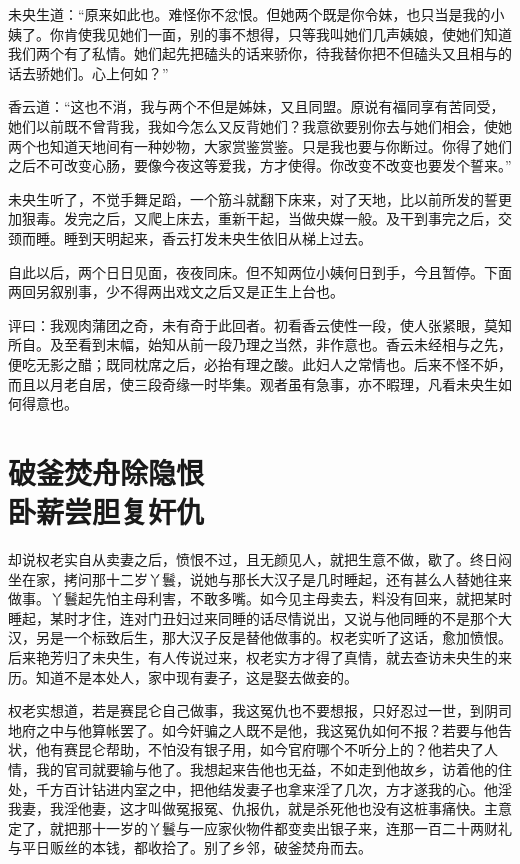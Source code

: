 \documentclass[a4paper,12pt,UTF8,twoside]{ctexbook}
\begin{document}
未央生道：“原来如此也。难怪你不忿恨。但她两个既是你令妹，也只当是我的小姨了。你肯使我见她们一面，别的事不想得，只等我叫她们几声姨娘，使她们知道我们两个有了私情。她们起先把磕头的话来骄你，待我替你把不但磕头又且相与的话去骄她们。心上何如？”

香云道：“这也不消，我与两个不但是姊妹，又且同盟。原说有福同享有苦同受，她们以前既不曾背我，我如今怎么又反背她们？我意欲要别你去与她们相会，使她两个也知道天地间有一种妙物，大家赏鉴赏鉴。只是我也要与你断过。你得了她们之后不可改变心肠，要像今夜这等爱我，方才使得。你改变不改变也要发个誓来。”

未央生听了，不觉手舞足蹈，一个筋斗就翻下床来，对了天地，比以前所发的誓更加狠毒。发完之后，又爬上床去，重新干起，当做央媒一般。及干到事完之后，交颈而睡。睡到天明起来，香云打发未央生依旧从梯上过去。

自此以后，两个日日见面，夜夜同床。但不知两位小姨何日到手，今且暂停。下面两回另叙别事，少不得两出戏文之后又是正生上台也。

评曰：我观肉蒲团之奇，未有奇于此回者。初看香云使性一段，使人张紧眼，莫知所自。及至看到末幅，始知从前一段乃理之当然，非作意也。香云未经相与之先，便吃无影之醋；既同枕席之后，必抬有理之酸。此妇人之常情也。后来不怪不妒，而且以月老自居，使三段奇缘一时毕集。观者虽有急事，亦不暇理，凡看未央生如何得意也。

\chapter[破釜焚舟除隐恨\ 卧薪尝胆复奸仇]{破釜焚舟除隐恨\\卧薪尝胆复奸仇}

却说权老实自从卖妻之后，愤恨不过，且无颜见人，就把生意不做，歇了。终日闷坐在家，拷问那十二岁丫鬟，说她与那长大汉子是几时睡起，还有甚么人替她往来做事。丫鬟起先怕主母利害，不敢多嘴。如今见主母卖去，料没有回来，就把某时睡起，某时才住，连对门丑妇过来同睡的话尽情说出，又说与他同睡的不是那个大汉，另是一个标致后生，那大汉子反是替他做事的。权老实听了这话，愈加愤恨。后来艳芳归了未央生，有人传说过来，权老实方才得了真情，就去查访未央生的来历。知道不是本处人，家中现有妻子，这是娶去做妾的。

权老实想道，若是赛昆仑自己做事，我这冤仇也不要想报，只好忍过一世，到阴司地府之中与他算帐罢了。如今奸骗之人既不是他，我这冤仇如何不报？若要与他告状，他有赛昆仑帮助，不怕没有银子用，如今官府哪个不听分上的？他若央了人情，我的官司就要输与他了。我想起来告他也无益，不如走到他故乡，访着他的住处，千方百计钻进内室之中，把他结发妻子也拿来淫了几次，方才遂我的心。他淫我妻，我淫他妻，这才叫做冤报冤、仇报仇，就是杀死他也没有这桩事痛快。主意定了，就把那十一岁的丫鬟与一应家伙物件都变卖出银子来，连那一百二十两财礼与平日贩丝的本钱，都收拾了。别了乡邻，破釜焚舟而去。
\end{document}
